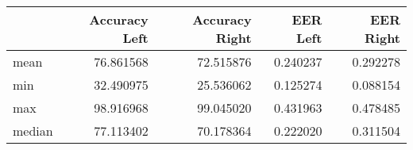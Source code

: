 \begin{tabular}{lrrrr}
\toprule
{} &  Accuracy Left &  Accuracy Right &  EER Left &  EER Right \\
\midrule
mean   &      76.861568 &       72.515876 &  0.240237 &   0.292278 \\
min    &      32.490975 &       25.536062 &  0.125274 &   0.088154 \\
max    &      98.916968 &       99.045020 &  0.431963 &   0.478485 \\
median &      77.113402 &       70.178364 &  0.222020 &   0.311504 \\
\bottomrule
\end{tabular}
